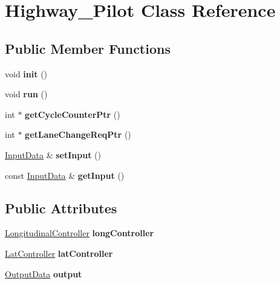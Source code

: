 \hypertarget{class_highway___pilot}{}\section{Highway\+\_\+\+Pilot Class Reference}
\label{class_highway___pilot}
\subsection*{Public Member Functions}
\begin{DoxyCompactItemize}
\item 
\mbox{\label{class_highway___pilot_a08a322cd592ed9d35ea7cd0c99e6f95e}} 
void {\bfseries init} ()
\item 
\mbox{\label{class_highway___pilot_a80b7f8d969f8dd546872970dfeebb562}} 
void {\bfseries run} ()
\item 
\mbox{\label{class_highway___pilot_a7f4594a67098d9bd12620667cf06e296}} 
int $\ast$ {\bfseries get\+Cycle\+Counter\+Ptr} ()
\item 
\mbox{\label{class_highway___pilot_a34a60f51231b196c647442d7c6923861}} 
int $\ast$ {\bfseries get\+Lane\+Change\+Req\+Ptr} ()
\item 
\mbox{\label{class_highway___pilot_a4c78a03a96983b62ea538dfc32c381cb}} 
\mbox{\hyperlink{struct_input_data}{Input\+Data}} \& {\bfseries set\+Input} ()
\item 
\mbox{\label{class_highway___pilot_ae3c887e2f08d108d326863d3970ac7c0}} 
const \mbox{\hyperlink{struct_input_data}{Input\+Data}} \& {\bfseries get\+Input} ()
\end{DoxyCompactItemize}
\subsection*{Public Attributes}
\begin{DoxyCompactItemize}
\item 
\mbox{\label{class_highway___pilot_a89ab950f9a0578d4dfcaa35c1626d5ee}} 
\mbox{\hyperlink{class_longitudinal_controller}{Longitudinal\+Controller}} {\bfseries long\+Controller}
\item 
\mbox{\label{class_highway___pilot_ac369e8bd81b6fa677659d4d990829d26}} 
\mbox{\hyperlink{class_lat_controller}{Lat\+Controller}} {\bfseries lat\+Controller}
\item 
\mbox{\label{class_highway___pilot_a74e49fd2f83c0758aa984dd793db9319}} 
\mbox{\hyperlink{struct_output_data}{Output\+Data}} {\bfseries output}
\end{DoxyCompactItemize}


